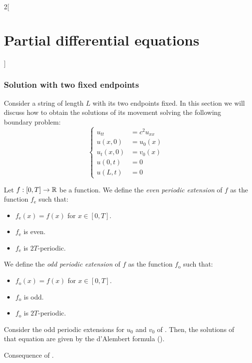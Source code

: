 \documentclass[../../../main_math.tex]{subfiles}
\begin{document}
\begin{multicols}{2}[\section{Partial differential equations}]
  \subsubsection{Solution with two fixed endpoints}
  Consider a string of length $L$ with its two endpoints fixed. In this section we will discuss how to obtain the solutions of its movement solving the following boundary problem:
  \begin{equation}\label{PDE:fixedendpoints}
    \left\{
    \begin{aligned}
      u_{tt}   & =c^2u_{xx} \\
      u(x,0)   & =u_0(x)    \\
      u_t(x,0) & =v_0(x)    \\
      u(0,t)   & =0         \\
      u(L,t)   & =0
    \end{aligned}
    \right.
  \end{equation}
  \begin{definition}
    Let $f:[0,T]\rightarrow\mathbb{R}$ be a function. We define the \emph{even periodic extension} of $f$ as the function $f_{\mathrm{e}}$ such that:
    \begin{itemize}
      \item $f_{\mathrm{e}}(x)=f(x)$ for $x\in[0, T]$.
      \item $f_{\mathrm{e}}$ is even.
      \item $f_{\mathrm{e}}$ is $2T$-periodic.
    \end{itemize}
    We define the \emph{odd periodic extension} of $f$ as the function $f_{\mathrm{o}}$ such that:
    \begin{itemize}
      \item $f_{\mathrm{o}}(x)=f(x)$ for $x\in[0, T]$.
      \item $f_{\mathrm{o}}$ is odd.
      \item $f_{\mathrm{o}}$ is $2T$-periodic.
    \end{itemize}
  \end{definition}
  \begin{proposition}
    Consider the odd periodic extensions for $u_0$ and $v_0$ of . Then, the solutions of that equation are given by the d'Alembert formula ().
  \end{proposition}
  \begin{sproof}
    Consequence of .
  \end{sproof}
  \begin{proposition}\label{PDE:methodchar}

\end{proposition}
\end{multicols}
\end{document}
